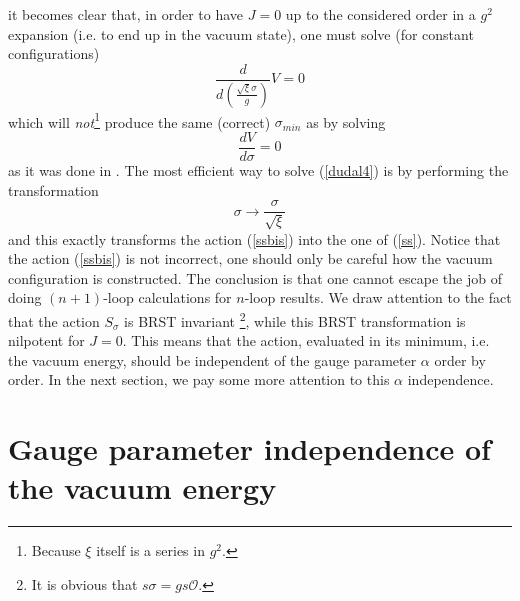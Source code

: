 \documentclass[a4paper,12pt]{article}
\newcommand{\sect}[1]{ \section{#1} \setcounter{equation}{0} }
\begin{document}
it becomes clear that, in order to have $J=0$ up to the considered order in
a $g^{2}$ expansion (i.e. to end up in the vacuum state), one must solve
(for constant configurations)
\begin{equation}  \label{dudal4}
\frac{d}{d\left(\frac{\sqrt{\xi}\sigma}{g}\right) }V=0
\end{equation}
which will \emph{not}\footnote{%
Because $\xi$ itself is a series in $g^{2}$.} produce the same (correct) $%
\sigma_{min}$ as by solving
\begin{equation}  \label{dudal5}
\frac{dV}{d \sigma}=0
\end{equation}
as it was done in \cite{Lemes:2002rc}. The most efficient way to
solve (\ref {dudal4}) is by performing the transformation
\begin{equation}  \label{dudal6}
\sigma\rightarrow\frac{\sigma}{\sqrt{\xi}}
\end{equation}
and this exactly transforms the action (\ref{ssbis}) into the one
of (\ref {ss}). Notice that the action (\ref{ssbis}) is not
incorrect, one should only be careful how the vacuum configuration
is constructed. The conclusion is that one cannot escape the job
of doing $(n+1)$-loop calculations for $n $-loop results. \newline
\newline
We draw attention to the fact that the action $S_{\sigma}$ is BRST invariant%
\footnote{%
It is obvious that $s\sigma=gs\mathcal{O}$.}, while this BRST
transformation is nilpotent for $J=0$. This means that the action,
evaluated in its minimum, i.e. the vacuum energy, should be
independent of the gauge parameter $\alpha$ order by order. In the
next section, we pay some more attention to this $\alpha$
independence.

\sect{Gauge parameter independence of the vacuum energy}
\end{document}
